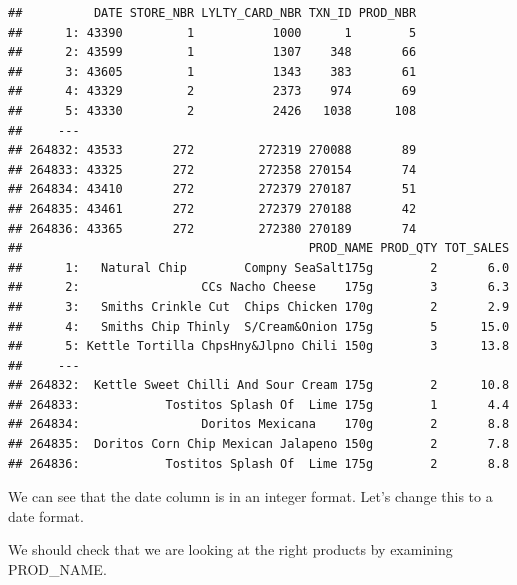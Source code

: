 \documentclass[
]{article}
\newenvironment{Shaded}{\begin{snugshade}}{\end{snugshade}}
\newcommand{\AttributeTok}[1]{\textcolor[rgb]{0.13,0.29,0.53}{#1}}
\newcommand{\DocumentationTok}[1]{\textcolor[rgb]{0.56,0.35,0.01}{\textbf{\textit{#1}}}}
\newcommand{\FunctionTok}[1]{\textcolor[rgb]{0.13,0.29,0.53}{\textbf{#1}}}
\newcommand{\NormalTok}[1]{#1}
\newcommand{\OtherTok}[1]{\textcolor[rgb]{0.56,0.35,0.01}{#1}}
\newcommand{\SpecialCharTok}[1]{\textcolor[rgb]{0.81,0.36,0.00}{\textbf{#1}}}
\newcommand{\StringTok}[1]{\textcolor[rgb]{0.31,0.60,0.02}{#1}}
\begin{document}
\begin{verbatim}
##          DATE STORE_NBR LYLTY_CARD_NBR TXN_ID PROD_NBR
##      1: 43390         1           1000      1        5
##      2: 43599         1           1307    348       66
##      3: 43605         1           1343    383       61
##      4: 43329         2           2373    974       69
##      5: 43330         2           2426   1038      108
##     ---                                               
## 264832: 43533       272         272319 270088       89
## 264833: 43325       272         272358 270154       74
## 264834: 43410       272         272379 270187       51
## 264835: 43461       272         272379 270188       42
## 264836: 43365       272         272380 270189       74
##                                        PROD_NAME PROD_QTY TOT_SALES
##      1:   Natural Chip        Compny SeaSalt175g        2       6.0
##      2:                 CCs Nacho Cheese    175g        3       6.3
##      3:   Smiths Crinkle Cut  Chips Chicken 170g        2       2.9
##      4:   Smiths Chip Thinly  S/Cream&Onion 175g        5      15.0
##      5: Kettle Tortilla ChpsHny&Jlpno Chili 150g        3      13.8
##     ---                                                            
## 264832:  Kettle Sweet Chilli And Sour Cream 175g        2      10.8
## 264833:            Tostitos Splash Of  Lime 175g        1       4.4
## 264834:                 Doritos Mexicana    170g        2       8.8
## 264835:  Doritos Corn Chip Mexican Jalapeno 150g        2       7.8
## 264836:            Tostitos Splash Of  Lime 175g        2       8.8
\end{verbatim}

We can see that the date column is in an integer format. Let's change
this to a date format.

\begin{Shaded}
\end{Shaded}

We should check that we are looking at the right products by examining
PROD\_NAME.
\end{document}
